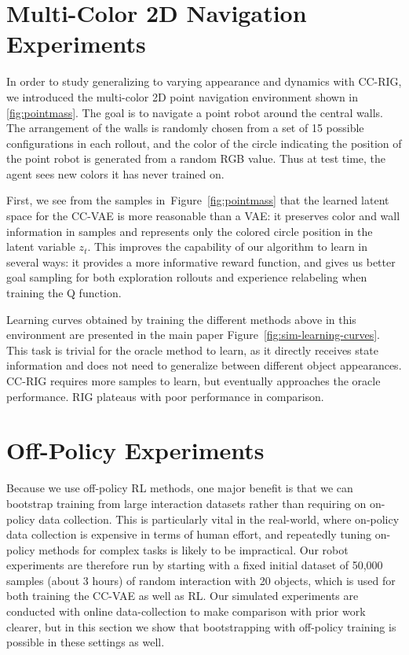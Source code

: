 \documentclass{article}
\begin{document}
\section{Multi-Color 2D Navigation Experiments} \label{sec:pointmass}

In order to study generalizing to varying appearance and dynamics with CC-RIG, we introduced the multi-color 2D point navigation environment shown in \ref{fig:pointmass}. The goal is to navigate a point robot around the central walls. The arrangement of the walls is randomly chosen from a set of 15 possible configurations in each rollout, and the color of the circle indicating the position of the point robot is generated from a random RGB value. Thus at test time, the agent sees new colors it has never trained on.

First, we see from the samples in~Figure~\ref{fig:pointmass} that the learned latent space for the CC-VAE is more reasonable than a VAE: it preserves color and wall information in samples and represents only the colored circle position in the latent variable $z_t$. This improves the capability of our algorithm to learn in several ways: it provides a more informative reward function, and gives us better goal sampling for both exploration rollouts and experience relabeling when training the Q function.

Learning curves obtained by training the different methods above in this environment are presented in the main paper Figure~\ref{fig:sim-learning-curves}. This task is trivial for the oracle method to learn, as it directly receives state information and does not need to generalize between different object appearances. CC-RIG requires more samples to learn, but eventually approaches the oracle performance. RIG plateaus with poor performance in comparison.

\pagebreak

\section{Off-Policy Experiments}

Because we use off-policy RL methods, one major benefit is that we can bootstrap training from large interaction datasets rather than requiring on on-policy data collection. This is particularly vital in the real-world, where on-policy data collection is expensive in terms of human effort, and repeatedly tuning on-policy methods for complex tasks is likely to be impractical. Our robot experiments are therefore run by starting with a fixed initial dataset of 50,000 samples (about 3 hours) of random interaction with 20 objects, which is used for both training the CC-VAE as well as RL. Our simulated experiments are conducted with online data-collection to make comparison with prior work clearer, but in this section we show that bootstrapping with off-policy training is possible in these settings as well.
\end{document}
